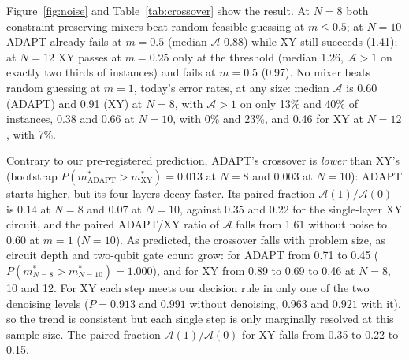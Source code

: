 \documentclass[11pt]{article}
\newcommand{\Amp}{\mathcal{A}}
\begin{document}
Figure~\ref{fig:noise} and Table~\ref{tab:crossover} show the result. At $N=8$ both
constraint-preserving mixers beat random feasible guessing at $m\le0.5$; at $N=10$ ADAPT already
fails at $m=0.5$ (median $\Amp$ 0.88) while XY still succeeds (1.41); at $N=12$ XY passes at
$m=0.25$ only at the threshold (median 1.26, $\Amp>1$ on exactly two thirds of instances) and
fails at $m=0.5$ (0.97). No mixer beats random guessing at $m=1$, today's error rates, at any
size: median $\Amp$ is 0.60 (ADAPT) and 0.91 (XY) at $N=8$, with $\Amp>1$ on only 13\% and 40\% of
instances, 0.38 and 0.66 at $N=10$, with 0\% and 23\%, and 0.46 for XY at $N=12$, with 7\%.

Contrary to our pre-registered prediction, ADAPT's crossover is \emph{lower} than XY's (bootstrap
$P(m^\ast_{\mathrm{ADAPT}}>m^\ast_{\mathrm{XY}})=0.013$ at $N=8$ and $0.003$ at $N=10$): ADAPT
starts higher, but its four layers decay faster. Its paired fraction $\Amp(1)/\Amp(0)$ is 0.14 at
$N=8$ and 0.07 at $N=10$, against 0.35 and 0.22 for the single-layer XY circuit, and the paired
ADAPT/XY ratio of $\Amp$ falls from 1.61 without noise to 0.60 at $m=1$ ($N=10$). As predicted,
the crossover falls with problem size, as circuit depth and two-qubit gate count grow: for ADAPT
from 0.71 to 0.45 ($P(m^\ast_{N=8}>m^\ast_{N=10})=1.000$), and for XY from 0.89 to 0.69 to 0.46
at $N=8$, 10 and 12. For XY each step meets our decision rule in only one of the two denoising
levels ($P=0.913$ and $0.991$ without denoising, $0.963$ and $0.921$ with it), so the trend is
consistent but each single step is only marginally resolved at this sample size. The paired
fraction $\Amp(1)/\Amp(0)$ for XY falls from 0.35 to 0.22 to 0.15.
\end{document}
